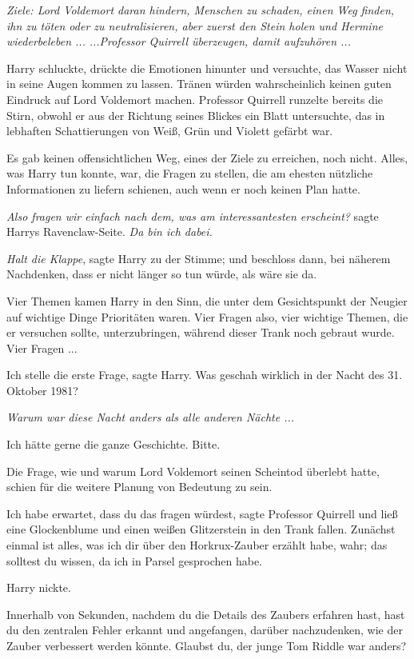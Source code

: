 \emph{Ziele: Lord Voldemort daran hindern, Menschen zu schaden, einen Weg
finden, ihn zu töten oder zu neutralisieren, aber zuerst den Stein holen und
Hermine wiederbeleben ...}
\emph{...Professor Quirrell überzeugen, damit aufzuhören ...}

Harry schluckte, drückte die Emotionen hinunter und versuchte, das Wasser nicht
in seine Augen kommen zu lassen. Tränen würden wahrscheinlich keinen guten
Eindruck auf Lord Voldemort machen. Professor Quirrell runzelte bereits die
Stirn, obwohl er aus der Richtung seines Blickes ein Blatt untersuchte, das in
lebhaften Schattierungen von Weiß, Grün und Violett gefärbt war.

Es gab keinen offensichtlichen Weg, eines der Ziele zu erreichen, noch nicht.
Alles, was Harry tun konnte, war, die Fragen zu stellen, die am ehesten
nützliche Informationen zu liefern schienen, auch wenn er noch keinen Plan
hatte.

\emph{Also fragen wir einfach nach dem, was am interessantesten erscheint?
}sagte Harrys Ravenclaw-Seite. \emph{Da bin ich dabei.}

\emph{Halt die Klappe}, sagte Harry zu der Stimme; und beschloss dann, bei
näherem Nachdenken, dass er nicht länger so tun würde, als wäre sie da.

Vier Themen kamen Harry in den Sinn, die unter dem Gesichtspunkt der Neugier auf
wichtige Dinge Prioritäten waren. Vier Fragen also, vier wichtige Themen, die er
versuchen sollte, unterzubringen, während dieser Trank noch gebraut wurde. Vier
Fragen ...

\glqq{}Ich stelle die erste Frage\grqq{}, sagte Harry. \glqq{}Was geschah wirklich
in der Nacht des 31. Oktober 1981?\grqq{}

\emph{Warum war diese Nacht anders als alle anderen Nächte ...}

\glqq{}Ich hätte gerne die ganze Geschichte. Bitte.\grqq{}

Die Frage, wie und warum Lord Voldemort seinen Scheintod überlebt hatte, schien
für die weitere Planung von Bedeutung zu sein.

\glqq{}Ich habe erwartet, dass du das fragen würdest\grqq{}, sagte Professor
Quirrell und ließ eine Glockenblume und einen weißen Glitzerstein in den Trank
fallen. \glqq{}Zunächst einmal ist alles, was ich dir über den Horkrux-Zauber
erzählt habe, wahr; das solltest du wissen, da ich in Parsel gesprochen
habe.\grqq{}

Harry nickte.

\glqq{}Innerhalb von Sekunden, nachdem du die Details des Zaubers erfahren hast,
hast du den zentralen Fehler erkannt und angefangen, darüber nachzudenken, wie
der Zauber verbessert werden könnte. Glaubst du, der junge Tom Riddle war
anders?\grqq{}

